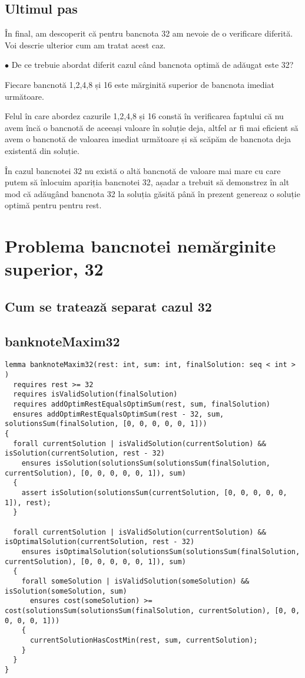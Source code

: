     \subsection{Ultimul pas}
    În final, am descoperit că pentru bancnota 32 am nevoie de o verificare diferită. Voi descrie ulterior cum am tratat acest caz.\par
    $\bullet$ De ce trebuie abordat diferit cazul când bancnota optimă de adăugat este 32?\par
    Fiecare bancnotă 1,2,4,8 și 16 este mărginită superior de bancnota imediat următoare.\par
    Felul în care abordez cazurile 1,2,4,8 și 16 constă în verificarea faptului că 
    nu avem încă o bancnotă de aceeași valoare în soluție deja, altfel ar fi mai eficient să avem  
    o bancnotă de valoarea imediat următoare și să scăpăm de bancnota deja existentă din soluție.\par
    În cazul bancnotei 32 nu există o altă bancnotă de valoare mai mare cu care putem să înlocuim apariția bancnotei 32,
    așadar a trebuit să demonstrez în alt mod că adăugând bancnota 32 la soluția găsită până în prezent genereaz o soluție optimă pentru 
    pentru rest.   
    
    
    
    
\section{Problema bancnotei nemărginite superior, 32}

\subsection{Cum se tratează separat cazul 32}

\subsection{banknoteMaxim32}
\begin{lstlisting}
lemma banknoteMaxim32(rest: int, sum: int, finalSolution: seq < int > )
  requires rest >= 32
  requires isValidSolution(finalSolution)
  requires addOptimRestEqualsOptimSum(rest, sum, finalSolution)
  ensures addOptimRestEqualsOptimSum(rest - 32, sum, solutionsSum(finalSolution, [0, 0, 0, 0, 0, 1])) 
{
  forall currentSolution | isValidSolution(currentSolution) && isSolution(currentSolution, rest - 32)
    ensures isSolution(solutionsSum(solutionsSum(finalSolution, currentSolution), [0, 0, 0, 0, 0, 1]), sum) 
  {
    assert isSolution(solutionsSum(currentSolution, [0, 0, 0, 0, 0, 1]), rest);
  }

  forall currentSolution | isValidSolution(currentSolution) && isOptimalSolution(currentSolution, rest - 32)
    ensures isOptimalSolution(solutionsSum(solutionsSum(finalSolution, currentSolution), [0, 0, 0, 0, 0, 1]), sum)
  {
    forall someSolution | isValidSolution(someSolution) && isSolution(someSolution, sum)
      ensures cost(someSolution) >= cost(solutionsSum(solutionsSum(finalSolution, currentSolution), [0, 0, 0, 0, 0, 1])) 
    {
      currentSolutionHasCostMin(rest, sum, currentSolution);
    }
  }
}
\end{lstlisting}

